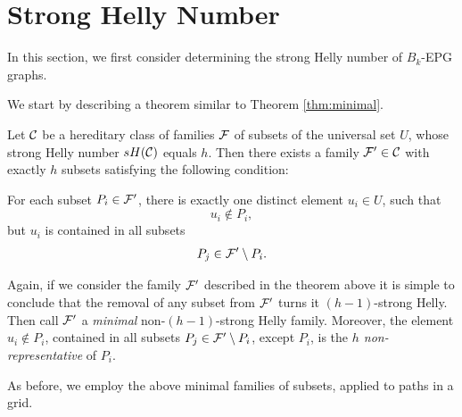\section{Strong Helly Number} \label{sec:strongHellyNumber}

In this section, we first consider determining the strong Helly number of $B_k$-EPG graphs.

We start by describing a theorem similar to Theorem \ref{thm:minimal}.

\begin{theorem}\label{thm:minimal-strong}

Let ${\cal C}$ be a hereditary class of families $\cal F$ of subsets of the universal set $U$, whose strong Helly number $sH({\cal C})$ equals $h$. Then there exists a family ${\cal F'} \in {\cal C}$ with exactly $h$ subsets satisfying the following condition: 

For each subset $P_i \in \cal {F'}$, there is exactly one distinct element $u_i \in U$, such that \\
$$u_i \not \in P_i,$$ 
but $u_i$ is contained in all  subsets 
$$P_j \in {\cal F'} \setminus P_i.$$
\end{theorem}


Again, if we consider the family $\cal F'$ described in the theorem above it is simple to conclude that the removal of any subset from $\cal {F'}$ turns it $(h-1)$-strong Helly.  Then call $\cal {F'}$ a {\it minimal} non-$(h-1)$-strong Helly family. Moreover, the element $u_i \not \in P_i$, contained in all subsets $P_j \in {\cal{F'}} \setminus P_i$, except $P_i$, is the {\it $h$ non-representative} of $P_i$.  

As before, we employ the above minimal families of subsets, applied to paths in a grid.

